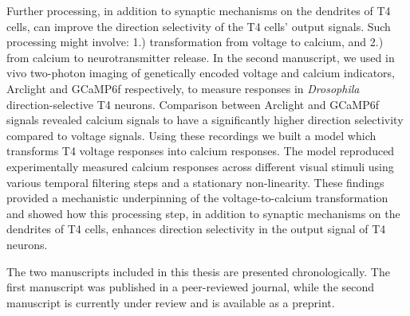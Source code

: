 Further processing, in addition to synaptic mechanisms on the dendrites of T4 cells, can improve the direction selectivity of the T4 cells' output signals. Such processing might involve: 1.) transformation from voltage to calcium, and 2.) from calcium to neurotransmitter release. In the second manuscript, we used in vivo two-photon imaging of genetically encoded voltage and calcium indicators, Arclight and GCaMP6f respectively, to measure responses in \textit{Drosophila} direction-selective T4 neurons. Comparison between Arclight and GCaMP6f signals revealed calcium signals to have a significantly higher direction selectivity compared to voltage signals. Using these recordings we built a model which transforms T4 voltage responses into calcium responses. The model reproduced experimentally measured calcium responses across different visual stimuli using various temporal filtering steps and a stationary non-linearity. These findings provided a mechanistic underpinning of the voltage-to-calcium transformation and showed how this processing step, in addition to synaptic mechanisms on the dendrites of T4 cells, enhances direction selectivity in the output signal of T4 neurons.

The two manuscripts included in this thesis are presented chronologically. The first manuscript was published in a peer-reviewed journal, while the second manuscript is currently under review and is available as a preprint. 


% 


\vfill


\endgroup			

\vfill

